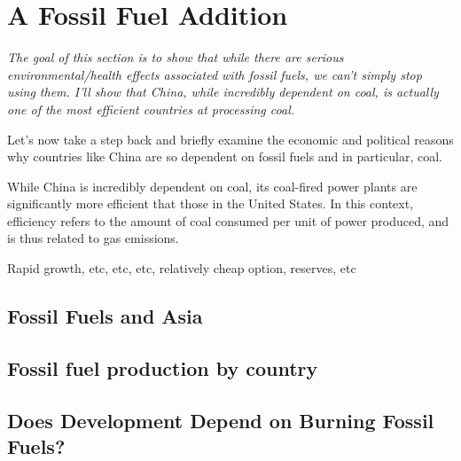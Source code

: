 \section{A Fossil Fuel Addition}

\emph{The goal of this section is to show that while there are serious environmental/health effects associated with fossil fuels, we can't simply stop using them. I'll show that China, while incredibly dependent on coal, is actually one of the most efficient countries at processing coal. }

Let's now take a step back and briefly examine the economic and political reasons why countries like China are so dependent on fossil fuels and in particular, coal.  

While China is incredibly dependent on coal, its coal-fired power plants are significantly more efficient that those in the United States. In this context, efficiency refers to the amount of coal consumed per unit of power produced, and is thus related to gas emissions. 

Rapid growth, etc, etc, etc, relatively cheap option, reserves, etc

\subsection{Fossil Fuels and Asia}

\subsection{Fossil fuel production by country}

\subsection{Does Development Depend on Burning Fossil Fuels?}











